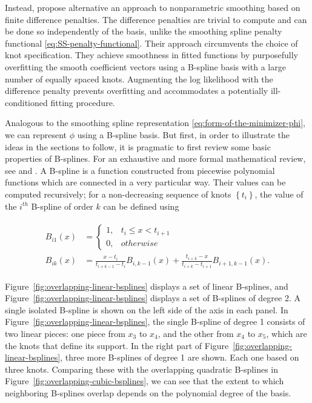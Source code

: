 \bigskip

Instead, \cite{eilers1996flexible} propose alternative an approach to nonparametric smoothing based on finite difference penalties. The difference penalties are trivial to compute and can be done so independently of the basis, unlike the smoothing spline penalty functional \eqref{eq:SS-penalty-functional}. Their approach circumvents the choice of knot specification. They achieve smoothness in fitted functions by purposefully overfitting the smooth coefficient vectors using a B-spline basis with a large number of equally spaced knots.  Augmenting the log likelihood with the difference penalty prevents overfitting and accommodates a potentially ill-conditioned fitting procedure. 

\bigskip

Analogous to the smoothing spline representation \eqref{eq:form-of-the-minimizer-phi}, we can represent $\phi$ using a B-spline basis. But first, in order to illustrate the ideas in the sections to follow, it is pragmatic to first review some basic properties of B-splines. For an exhaustive and more formal mathematical review, see  \cite{de1978practical} and \cite{dierckx1995curve}. A B-spline is a function constructed from piecewise polynomial functions which are connected in a very particular way. Their values can be computed recursively; for a non-decreasing sequence of knots $\left\{t_i\right\}$, the value of the $i^{th}$ B-spline of order $k$ can be defined using

\begin{align} 
\begin{split} \label{eq:bspline-recursive-relation}
B_{i1}\left(x\right) &= \left\{ \begin{array}{ll}
1, & t_i \le x < t_{i+1}\\
0, & otherwise
\end{array} \right.
\\
B_{ik}\left(x\right) &= \frac{x-t_i}{t_{i+k-1}-t_i}B_{i,k-1}\left(x\right) + \frac{t_{i+k}-x}{t_{i+k}-t_{i+1}}B_{i+1,k-1}\left(x\right). 
\end{split}
\end{align}

Figure~\ref{fig:overlapping-linear-bsplines} displays a set of linear B-splines, and Figure~\ref{fig:overlapping-linear-bsplines} displays a set of B-splines of degree 2. A single isolated B-spline is shown on the left side of the axis in each panel. In Figure~\ref{fig:overlapping-linear-bsplines}, the single B-spline of degree 1 consists of two linear pieces: one piece from $x_3$ to $x_4$, and the other from $x_4$ to $x_5$, which are the knots that define its support. In the right part of Figure~\ref{fig:overlapping-linear-bsplines}, three more B-splines of degree 1 are shown. Each one based on three knots. Comparing these with the overlapping quadratic B-splines in Figure~\ref{fig:overlapping-cubic-bsplines}, we can see that the extent to which neighboring B-splines overlap depends on the polynomial degree of the basis. 


